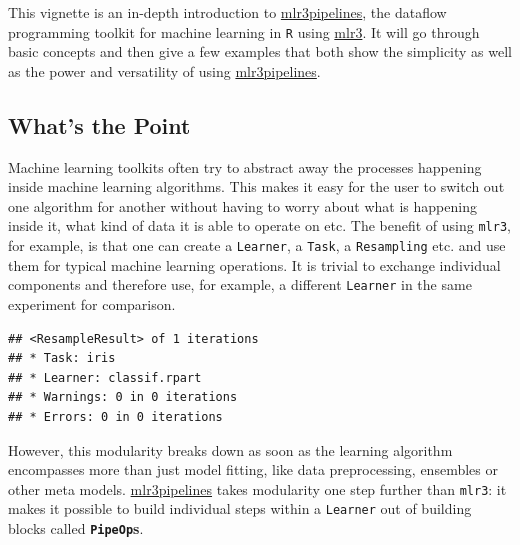 \documentclass[]{scrbook}
\newenvironment{Shaded}{\begin{snugshade}}{\end{snugshade}}
\newcommand{\KeywordTok}[1]{\textcolor[rgb]{0.13,0.29,0.53}{\textbf{#1}}}
\newcommand{\NormalTok}[1]{#1}
\newcommand{\OperatorTok}[1]{\textcolor[rgb]{0.81,0.36,0.00}{\textbf{#1}}}
\newcommand{\StringTok}[1]{\textcolor[rgb]{0.31,0.60,0.02}{#1}}
\renewenvironment{Shaded} {\begin{snugshade}\small} {\end{snugshade}}
\begin{document}
This vignette is an in-depth introduction to \href{https://cran.r-project.org/package=mlr3pipelines}{mlr3pipelines}, the dataflow programming toolkit for machine learning in \texttt{R} using \href{https://mlr3.mlr-org.com}{mlr3}.
It will go through basic concepts and then give a few examples that both show the simplicity as well as the power and versatility of using \href{https://cran.r-project.org/package=mlr3pipelines}{mlr3pipelines}.

\hypertarget{whats-the-point}{%
\subsection{What's the Point}\label{whats-the-point}}

Machine learning toolkits often try to abstract away the processes happening inside machine learning algorithms.
This makes it easy for the user to switch out one algorithm for another without having to worry about what is happening inside it, what kind of data it is able to operate on etc.
The benefit of using \texttt{mlr3}, for example, is that one can create a \texttt{Learner}, a \texttt{Task}, a \texttt{Resampling} etc. and use them for typical machine learning operations.
It is trivial to exchange individual components and therefore use, for example, a different \texttt{Learner} in the same experiment for comparison.

\begin{Shaded}
\end{Shaded}

\begin{verbatim}
## <ResampleResult> of 1 iterations
## * Task: iris
## * Learner: classif.rpart
## * Warnings: 0 in 0 iterations
## * Errors: 0 in 0 iterations
\end{verbatim}

However, this modularity breaks down as soon as the learning algorithm encompasses more than just model fitting, like data preprocessing, ensembles or other meta models.
\href{https://cran.r-project.org/package=mlr3pipelines}{mlr3pipelines} takes modularity one step further than \texttt{mlr3}: it makes it possible to build individual steps within a \texttt{Learner} out of building blocks called \textbf{\texttt{PipeOp}s}.
\end{document}
